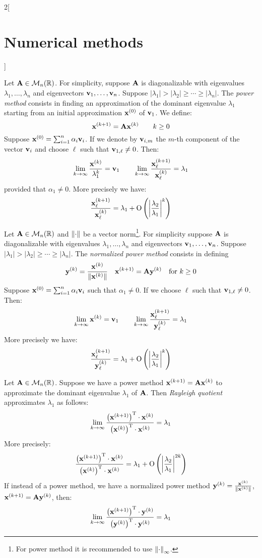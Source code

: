 \documentclass[../../../main_math.tex]{subfiles}
\begin{document}
\begin{multicols}{2}[\section{Numerical methods}]
\begin{proposition}
    Let $\boldsymbol{\mathrm{A}}\in\mathcal{M}_n(\mathbb{R})$. For simplicity, suppose $\boldsymbol{\mathrm{A}}$ is diagonalizable with eigenvalues $\lambda_1,\ldots,\lambda_n$ and eigenvectors $\boldsymbol{\mathrm{v}}_1,\ldots,\boldsymbol{\mathrm{v}}_n$. Suppose $|\lambda_1|>|\lambda_2|\geq\cdots\geq|\lambda_n|$. The \emph{power method} consists in finding an approximation of the dominant eigenvalue $\lambda_1$ starting from an initial approximation $\boldsymbol{\mathrm{x}}^{(0)}$ of $\boldsymbol{\mathrm{v}}_1$. We define: $$\boldsymbol{\mathrm{x}}^{(k+1)}=\boldsymbol{\mathrm{A}}\boldsymbol{\mathrm{x}}^{(k)}\qquad k\geq 0$$ Suppose $\boldsymbol{\mathrm{x}}^{(0)}=\sum_{i=1}^n\alpha_i\boldsymbol{\mathrm{v}}_i$. If we denote by $\boldsymbol{\mathrm{v}}_{i,m}$ the $m$-th component of the vector $\boldsymbol{\mathrm{v}}_i$ and choose $\ell$ such that $\boldsymbol{\mathrm{v}}_{1,\ell}\ne0$. Then: $$\lim_{k\to\infty}\frac{\boldsymbol{\mathrm{x}}^{(k)}}{\lambda_1^k}=\boldsymbol{\mathrm{v}}_1\qquad\lim_{k\to\infty}\frac{\boldsymbol{\mathrm{x}}_\ell^{(k+1)}}{\boldsymbol{\mathrm{x}}_\ell^{(k)}}=\lambda_1$$ provided that $\alpha_1\ne0$. More precisely we have: $$\frac{\boldsymbol{\mathrm{x}}_\ell^{(k+1)}}{\boldsymbol{\mathrm{x}}_\ell^{(k)}}=\lambda_1+\mathrm{O}\left(\left|\frac{\lambda_2}{\lambda_1}\right|^k\right)$$
  \end{proposition}
  \begin{proposition}
    Let $\boldsymbol{\mathrm{A}}\in\mathcal{M}_n(\mathbb{R})$ and $\left\|\cdot\right\|$ be a vector norm\footnote{For power method it is recommended to use $\left\|\cdot\right\|_\infty$.}. For simplicity suppose $\boldsymbol{\mathrm{A}}$ is diagonalizable with eigenvalues $\lambda_1,\ldots,\lambda_n$ and eigenvectors $\boldsymbol{\mathrm{v}}_1,\ldots,\boldsymbol{\mathrm{v}}_n$. Suppose $|\lambda_1|>|\lambda_2|\geq\cdots\geq|\lambda_n|$. The \emph{normalized power method} consists in defining $$\boldsymbol{\mathrm{y}}^{(k)}=\frac{\boldsymbol{\mathrm{x}}^{(k)}}{\|\boldsymbol{\mathrm{x}}^{(k)}\|}\quad\boldsymbol{\mathrm{x}}^{(k+1)}=\boldsymbol{\mathrm{A}}\boldsymbol{\mathrm{y}}^{(k)}\quad\text{for }k\geq 0$$ Suppose $\boldsymbol{\mathrm{x}}^{(0)}=\sum_{i=1}^n\alpha_i\boldsymbol{\mathrm{v}}_i$ such that $\alpha_1\ne0$. If we choose $\ell$ such that $\boldsymbol{\mathrm{v}}_{1,\ell}\ne0$. Then: $$\lim_{k\to\infty}\boldsymbol{\mathrm{x}}^{(k)}=\boldsymbol{\mathrm{v}}_1\qquad\lim_{k\to\infty}\frac{\boldsymbol{\mathrm{x}}_\ell^{(k+1)}}{\boldsymbol{\mathrm{y}}_\ell^{(k)}}=\lambda_1$$ More precisely we have: $$\frac{\boldsymbol{\mathrm{x}}_\ell^{(k+1)}}{\boldsymbol{\mathrm{y}}_\ell^{(k)}}=\lambda_1+\mathrm{O}\left(\left|\frac{\lambda_2}{\lambda_1}\right|^k\right)$$
  \end{proposition}
  \begin{proposition}
    Let $\boldsymbol{\mathrm{A}}\in\mathcal{M}_n(\mathbb{R})$. Suppose we have a power method $\boldsymbol{\mathrm{x}}^{(k+1)}=\boldsymbol{\mathrm{A}}\boldsymbol{\mathrm{x}}^{(k)}$ to approximate the dominant eigenvalue $\lambda_1$ of $\boldsymbol{\mathrm{A}}$. Then \emph{Rayleigh quotient} approximates $\lambda_1$ as follows: $$\lim_{k\to\infty}\frac{\left(\boldsymbol{\mathrm{x}}^{(k+1)}\right)^\mathrm{T}\cdot \boldsymbol{\mathrm{x}}^{(k)}}{\left(\boldsymbol{\mathrm{x}}^{(k)}\right)^\mathrm{T}\cdot\boldsymbol{\mathrm{x}}^{(k)}}=\lambda_1$$
    More precisely: $$\frac{\left(\boldsymbol{\mathrm{x}}^{(k+1)}\right)^\mathrm{T}\cdot \boldsymbol{\mathrm{x}}^{(k)}}{\left(\boldsymbol{\mathrm{x}}^{(k)}\right)^\mathrm{T}\cdot\boldsymbol{\mathrm{x}}^{(k)}}=\lambda_1+\mathrm{O}\left(\left|\frac{\lambda_2}{\lambda_1}\right|^{2k}\right)$$ If instead of a power method, we have a normalized power method $\boldsymbol{\mathrm{y}}^{(k)}=\frac{\boldsymbol{\mathrm{x}}^{(k)}}{\|\boldsymbol{\mathrm{x}}^{(k)}\|}$, $\boldsymbol{\mathrm{x}}^{(k+1)}=\boldsymbol{\mathrm{A}}\boldsymbol{\mathrm{y}}^{(k)}$, then: $$\lim_{k\to\infty}\frac{\left(\boldsymbol{\mathrm{x}}^{(k+1)}\right)^\mathrm{T}\cdot \boldsymbol{\mathrm{y}}^{(k)}}{\left(\boldsymbol{\mathrm{y}}^{(k)}\right)^\mathrm{T}\cdot\boldsymbol{\mathrm{y}}^{(k)}}=\lambda_1$$

\end{proposition}
\end{multicols}
\end{document}
